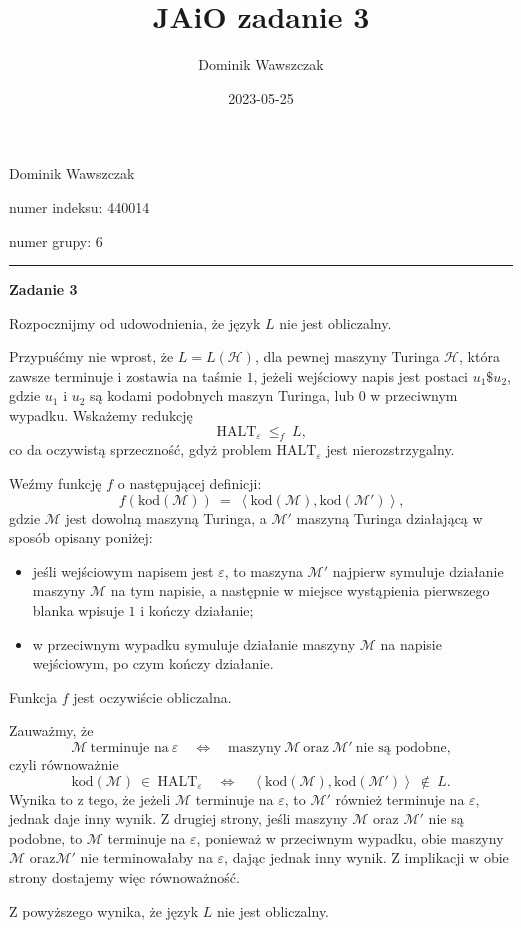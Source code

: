 \documentclass[12pt]{article}
\title{JAiO zadanie 3}
\author{Dominik Wawszczak}
\date{2023-05-25}
\begin{document}
	\setlength{\parindent}{0 cm}
	
	Dominik Wawszczak
	
	numer indeksu: 440014
	
	numer grupy: 6
	
	\bigskip
	\hrule
	\bigskip
	
	\textbf{Zadanie 3}
	
	\medskip
	
	Rozpocznijmy od udowodnienia, że język \(L\) nie jest obliczalny.
	
	\medskip
	
	Przypuśćmy nie wprost, że \(L = L \left( \mathcal{H} \right)\), dla pewnej
	maszyny Turinga \(\mathcal{H}\), która zawsze terminuje i zostawia na taśmie
	\(1\), jeżeli wejściowy napis jest postaci \(u_1 \$ u_2\), gdzie \(u_1\) i
	\(u_2\) są kodami podobnych maszyn Turinga, lub \(0\) w przeciwnym wypadku.
	Wskażemy redukcję
	\[ \text{HALT}_{\varepsilon} \ \leqslant_{f} \ L \text{,} \]
	co da oczywistą sprzeczność, gdyż problem \(\text{HALT}_{\varepsilon}\) jest
	nierozstrzygalny.
	
	\medskip
	
	Weźmy funkcję \(f\) o następującej definicji:
	\[ f \left( \text{kod} \left( \mathcal{M} \right) \right) \ = \ \left\langle
	\text{kod} \left( \mathcal{M} \right), \text{kod} \left( \mathcal{M}'
	\right) \right\rangle \text{,} \]
	gdzie \(\mathcal{M}\) jest dowolną maszyną Turinga, a \(\mathcal{M}'\)
	maszyną Turinga działającą w sposób opisany poniżej:
	\begin{itemize}
		\item jeśli wejściowym napisem jest \(\varepsilon\), to maszyna
		      \(\mathcal{M}'\) najpierw symuluje działanie maszyny
		      \(\mathcal{M}\) na tym napisie, a następnie w miejsce wystąpienia
		      pierwszego blanka wpisuje \(1\) i kończy działanie;
		\item w przeciwnym wypadku symuluje działanie maszyny \(\mathcal{M}\) na
		      napisie wejściowym, po czym kończy działanie.
	\end{itemize}
	Funkcja \(f\) jest oczywiście obliczalna.
	
	\medskip
	
	Zauważmy, że
	\[ \mathcal{M} \ \text{terminuje na} \ \varepsilon \quad \iff \quad
	\text{maszyny} \ \mathcal{M} \ \text{oraz} \ \mathcal{M}' \ \text{nie są
	podobne,} \]
	czyli równoważnie
	\[ \text{kod} \left( \mathcal{M} \right) \ \in \ \text{HALT}_{\varepsilon}
	\quad \iff \quad \left\langle \text{kod} \left( \mathcal{M} \right),
	\text{kod} \left( \mathcal{M}' \right) \right\rangle \ \notin \ L
	\text{.} \]
	Wynika to z tego, że jeżeli \(\mathcal{M}\) terminuje na \(\varepsilon\),
	to \(\mathcal{M}'\) również terminuje na \(\varepsilon\), jednak daje inny
	wynik. Z drugiej strony, jeśli maszyny \(\mathcal{M}\) oraz \(\mathcal{M}'\)
	nie są podobne, to \(\mathcal{M}\) terminuje na \(\varepsilon\), ponieważ w
	przeciwnym wypadku, obie maszyny \(\mathcal{M}\) oraz\(\mathcal{M}'\) nie
	terminowałaby na \(\varepsilon\), dając jednak inny wynik. Z implikacji w
	obie strony dostajemy więc równoważność.
	
	\medskip
	
	Z powyższego wynika, że język \(L\) nie jest obliczalny.
	
	\bigskip
	
	
\end{document}
